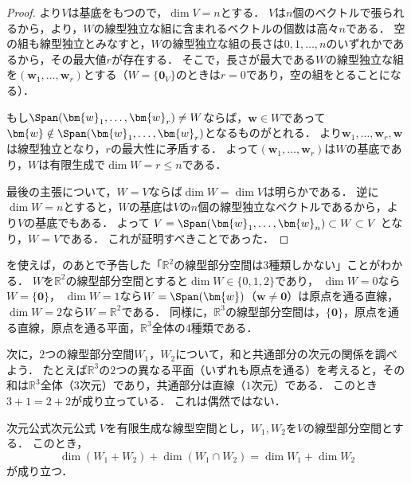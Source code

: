 \begin{tleftbar}
\begin{proof}
  より$V$は基底をもつので，$\dim V = n$とする．
  $V$は$n$個のベクトルで張られるから，より，$W$の線型独立な組に含まれるベクトルの個数は高々$n$である．
  空の組も線型独立とみなすと，$W$の線型独立な組の長さは$0, 1, \dots, n$のいずれかであるから，その最大値$r$が存在する．
  そこで，長さが最大である$W$の線型独立な組を$(\bm{w}_1, \dots, \bm{w}_r)$とする（$W = \{\bm{0}_V\}$のときは$r = 0$であり，空の組をとることになる）．

  もし$\Span(\bm{w}_1, \dots, \bm{w}_r) \ne W$ならば，$\bm{w} \in W$であって$\bm{w} \notin \Span(\bm{w}_1, \dots, \bm{w}_r)$となるものがとれる．
  より$\bm{w}_1, \dots, \bm{w}_r, \bm{w}$は線型独立となり，$r$の最大性に矛盾する．
  よって$(\bm{w}_1, \dots, \bm{w}_r)$は$W$の基底であり，$W$は有限生成で$\dim W = r \le n$である．

  最後の主張について，$W = V$ならば$\dim W = \dim V$は明らかである．
  逆に$\dim W = n$とすると，$W$の基底は$V$の$n$個の線型独立なベクトルであるから，より$V$の基底でもある．
  よって
  $V = \Span(\bm{w}_1, \dots, \bm{w}_n) \subset W \subset V$
  となり，$W = V$である．
  これが証明すべきことであった．
\end{proof}
\end{tleftbar}

を使えば，のあとで予告した「$\mathbb{R}^2$の線型部分空間は$3$種類しかない」ことがわかる．
$W$を$\mathbb{R}^2$の線型部分空間とすると$\dim W\in\{0,1,2\}$であり，
$\dim W=0$なら$W=\{\bm{0}\}$，
$\dim W=1$なら$W=\Span(\bm{w})$（$\bm{w}\ne\bm{0}$）は原点を通る直線，
$\dim W=2$なら$W=\mathbb{R}^2$である．
同様に，$\mathbb{R}^3$の線型部分空間は，$\{\bm{0}\}$，原点を通る直線，原点を通る平面，$\mathbb{R}^3$全体の$4$種類である．

次に，$2$つの線型部分空間$W_1$，$W_2$について，和と共通部分の次元の関係を調べよう．
たとえば$\mathbb{R}^3$の$2$つの異なる平面（いずれも原点を通る）を考えると，その和は$\mathbb{R}^3$全体（$3$次元）であり，共通部分は直線（$1$次元）である．
このとき$3+1=2+2$が成り立っている．
これは偶然ではない．

\begin{theorem}{次元公式}{次元公式}
  $V$を有限生成な線型空間とし，$W_1, W_2$を$V$の線型部分空間とする．
  このとき，
  \[
    \dim(W_1 + W_2) + \dim(W_1 \cap W_2) = \dim W_1 + \dim W_2
  \]
  が成り立つ．
\end{theorem}

